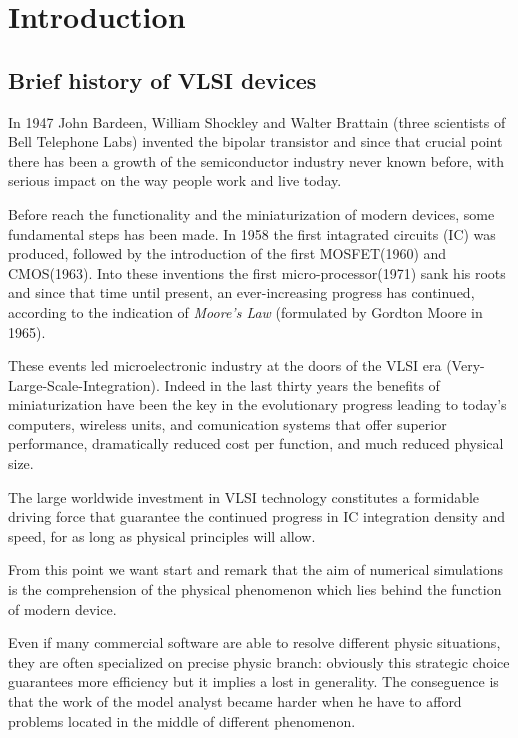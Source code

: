 \chapter{Introduction}
\section{Brief history of VLSI devices}


In 1947 John Bardeen, William Shockley and Walter Brattain (three scientists of Bell Telephone Labs) invented the bipolar transistor and since that crucial point there has been a growth  of the semiconductor industry never known before, with serious impact on the way people work and live today. 

Before reach the functionality and the miniaturization of modern devices, some fundamental steps has been made.
In 1958 the first intagrated circuits (IC) was produced, followed by the introduction of the first MOSFET(1960) and CMOS(1963). Into these inventions the first micro-processor(1971) sank his roots  and since that time until present, an ever-increasing progress has continued, according to the indication of \textit{Moore's Law} (formulated by Gordton Moore in 1965).

These events led microelectronic industry at the doors of the VLSI era (Very-Large-Scale-Integration). Indeed in the last thirty years the benefits of miniaturization have been the key in the evolutionary progress leading to today's computers, wireless units, and comunication systems that offer superior performance, dramatically reduced cost per function, and much reduced physical size.

The large worldwide investment in VLSI technology constitutes a formidable driving force that guarantee the continued progress in IC integration density and speed, for as long as physical principles will allow.

From this point we want start and remark that the aim of numerical simulations is the comprehension of the physical phenomenon which lies behind the function of modern device. 

Even if many commercial software are able to resolve different physic situations, they are often specialized on precise physic branch: obviously this strategic choice guarantees more efficiency but it implies a lost in generality. The conseguence is that the work of the model analyst became harder when he have to afford problems located in the middle of different phenomenon. 

